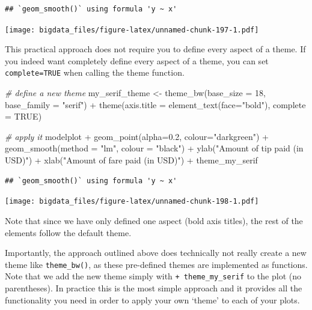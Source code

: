 \documentclass[
  12pt,
]{style/krantz}
\newenvironment{Shaded}{\begin{snugshade}}{\end{snugshade}}
\newcommand{\AttributeTok}[1]{\textcolor[rgb]{0.77,0.63,0.00}{#1}}
\newcommand{\CommentTok}[1]{\textcolor[rgb]{0.56,0.35,0.01}{\textit{#1}}}
\newcommand{\ConstantTok}[1]{\textcolor[rgb]{0.00,0.00,0.00}{#1}}
\newcommand{\DecValTok}[1]{\textcolor[rgb]{0.00,0.00,0.81}{#1}}
\newcommand{\FloatTok}[1]{\textcolor[rgb]{0.00,0.00,0.81}{#1}}
\newcommand{\FunctionTok}[1]{\textcolor[rgb]{0.00,0.00,0.00}{#1}}
\newcommand{\NormalTok}[1]{#1}
\newcommand{\OtherTok}[1]{\textcolor[rgb]{0.56,0.35,0.01}{#1}}
\newcommand{\SpecialCharTok}[1]{\textcolor[rgb]{0.00,0.00,0.00}{#1}}
\newcommand{\StringTok}[1]{\textcolor[rgb]{0.31,0.60,0.02}{#1}}
\begin{document}
\begin{verbatim}
## `geom_smooth()` using formula 'y ~ x'
\end{verbatim}

\texttt{[image: bigdata\_files/figure-latex/unnamed-chunk-197-1.pdf]}

This practical approach does not require you to define every aspect of a theme. If you indeed want completely define every aspect of a theme, you can set \texttt{complete=TRUE} when calling the theme function.

\begin{Shaded}
\begin{Highlighting}[]
\CommentTok{\# \textquotesingle{}define\textquotesingle{} a new theme}
\NormalTok{my\_serif\_theme }\OtherTok{\textless{}{-}}      
  \FunctionTok{theme\_bw}\NormalTok{(}\AttributeTok{base\_size =} \DecValTok{18}\NormalTok{, }\AttributeTok{base\_family =} \StringTok{"serif"}\NormalTok{) }\SpecialCharTok{+}
  \FunctionTok{theme}\NormalTok{(}\AttributeTok{axis.title =} \FunctionTok{element\_text}\NormalTok{(}\AttributeTok{face=}\StringTok{"bold"}\NormalTok{), }\AttributeTok{complete =} \ConstantTok{TRUE}\NormalTok{)}

\CommentTok{\# apply it }
\NormalTok{modelplot }\SpecialCharTok{+}
     \FunctionTok{geom\_point}\NormalTok{(}\AttributeTok{alpha=}\FloatTok{0.2}\NormalTok{, }\AttributeTok{colour=}\StringTok{"darkgreen"}\NormalTok{) }\SpecialCharTok{+}
     \FunctionTok{geom\_smooth}\NormalTok{(}\AttributeTok{method =} \StringTok{"lm"}\NormalTok{, }\AttributeTok{colour =} \StringTok{"black"}\NormalTok{) }\SpecialCharTok{+}
     \FunctionTok{ylab}\NormalTok{(}\StringTok{"Amount of tip paid (in USD)"}\NormalTok{) }\SpecialCharTok{+}
     \FunctionTok{xlab}\NormalTok{(}\StringTok{"Amount of fare paid (in USD)"}\NormalTok{) }\SpecialCharTok{+}
\NormalTok{  theme\_my\_serif}
\end{Highlighting}
\end{Shaded}

\begin{verbatim}
## `geom_smooth()` using formula 'y ~ x'
\end{verbatim}

\texttt{[image: bigdata\_files/figure-latex/unnamed-chunk-198-1.pdf]}

Note that since we have only defined one aspect (bold axis titles), the rest of the elements follow the default theme.

Importantly, the approach outlined above does technically not really create a new theme like \texttt{theme\_bw()}, as these pre-defined themes are implemented as functions. Note that we add the new theme simply with \texttt{+\ theme\_my\_serif} to the plot (no parentheses). In practice this is the most simple approach and it provides all the functionality you need in order to apply your own `theme' to each of your plots.
\end{document}
